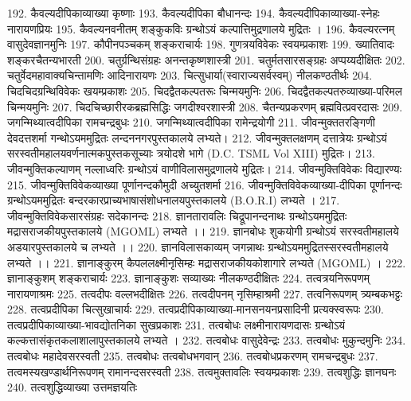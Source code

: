 192. कैवल्यदीपिकाव्याख्या				कृष्णाः
193.	कैवल्यदीपिका					बौधानन्दः
194.	कैवल्यदीपिकाव्याख्या-स्नेहः	नारायणप्रियः
195. कैवल्यनवनीतम् 					शङ्कुकविः
        ग्रन्थोऽयं कल्पात्तिमुद्रणालये मुद्रितः ।
196. कैवल्यरत्नम् 						वासुदेवज्ञानमुनिः
197. कौपीनपञ्चकम्						शङ्कराचार्यः
198. गुणत्रयविवेकः 						स्वयम्प्रकाशः
199. ख्यातिवादः						शङ्करचैतन्यभारती
200. चतुर्ग्रन्थिसंग्रहः					अनन्तकृष्णशास्त्री
201. चतुर्मतसारसङ्ग्रहः				अप्पय्यदीक्षितः
202. चतुर्वेदमहावाक्यचिन्तामणिः		आदिनारायणः
203. चित्सुधार्या(स्वाराज्यसर्वस्वम्)	नीलकण्ठतीर्थः
204. चिदचिदग्रन्थिविवेकः				खयम्प्रकाशः 
205. चिदद्वैतकल्पतरूः 				चिन्मयमुनिः
206. चिदद्वैतकल्पतरुव्याख्या-परिमल चिन्मयमुनिः
207. चिदचिच्छारीरकब्रह्मसिद्धिः		जगदीश्वरशास्त्री
208. चैतन्यप्रकरणम् 					ब्रह्मवित्प्रवरदासः 
209. जगन्मिथ्यात्वदीपिका				रामचन्द्रबुधः
210. जगन्मिथ्यात्वदीपिका				रामेन्द्रयोगी
211. जीवन्मुक्ततरङ्गिणी					देवदत्तशर्मा
	   गन्थोऽयममुद्रितः लन्दननगरपुस्तकालये लभ्यते।
212. जीवन्मुक्तलक्षणम् 					दत्तात्रेयः
	   ग्रन्थोऽयं सरस्वतीमहालयवर्णनात्मकपुस्तकसूच्याः त्रयोदशे भागे (D.C. TSML Vol XIII) मुद्रितः।
213. जीवन्मुक्तिकल्याणम् 				नल्लाध्वरिः
	   ग्रन्थोऽयं वाणीविलासमुद्रणालये मुद्रितः।
214. जीवन्मुक्तिविवेकः 					विद्यारण्यः
215. जीवन्मुक्तिविवेकव्याख्या पूर्णानन्दकौमुदी अच्युतशर्मा
216. जीवन्मुक्तिविवेकव्याख्या-दीपिका	पूर्णानन्दः
	   ग्रन्थोऽयममुद्रितः बन्दरकारप्राच्यभाषासंशोधनालयपुस्तकालये (B.O.R.I) लभ्यते । 
217. जीवन्मुक्तिविवेकसारसंग्रहः			सदेकानन्दः
218. ज्ञानतारावलिः						चिद्रूपानन्दनाथः
	   ग्रन्थोऽयममुद्रितः मद्रासराजकीयपुस्तकालये (MGOML) लभ्यते ।। 
219. ज्ञानबोधः							शुकयोगी
	   ग्रन्थोऽयं सरस्वतीमहालये अडयारपुस्तकालये च लभ्यते ।।
220. ज्ञानविलासकाव्यम् 				जगन्नाथः
	   ग्रन्थोऽयममुद्रितस्सरस्वतीमहालये लभ्यते ।।
221. ज्ञानाङ्कुरम् 							कैपललक्ष्मीनृसिम्हः
	   मद्रासराजकीयकोशागारे लभ्यते (MGOML) । 
222. ज्ञानाङ्कुशम् 						शङ्कराचार्यः
223. ज्ञानाङ्कुशः सव्याख्यः				नीलकण्ठदीक्षितः
224. तत्वत्रयनिरूपणम् 					नारायणाश्रमः 
225. तत्वदीपः							वल्लभदीक्षितः
226. तत्वदीपनम् 						नृसिम्हाश्रमी
227. तत्वनिरूपणम् 					त्र्यम्बकभट्टः
228. तत्वप्रदीपिका						चित्सुखाचार्यः
229. तत्वप्रदीपिकाव्याख्या-मानसनयनप्रसादिनी प्रत्यक्स्वरूपः
230. तत्वप्रदीपिकाव्याख्या-भावद्योतनिका सुखप्रकाशः
231. तत्वबोधः							लक्ष्मीनारायणदासः
	   ग्रन्थोऽयं कल्कत्तासंकृतकलाशालापुस्तकालये लभ्यते ।
232. तत्वबोधः 							वासुदेवेन्द्रः 
233. तत्वबोधः							मुकुन्दमुनिः
234. तत्वबोधः							महादेवसरस्वती
235. तत्वबोधः							तत्वबोधभगवान् 
236. तत्वबोधप्रकरणम्					रामचन्द्रबुधः
237. तत्वमस्यखण्डार्थनिरूपणम् 		रामानन्दसरस्वती
238. तत्वमुक्तावलिः						स्वयम्प्रकाशः
239. तत्वशुद्धिः							ज्ञानघनः
240. तत्वशुद्धिव्याख्या 					उत्तमज्ञयतिः
